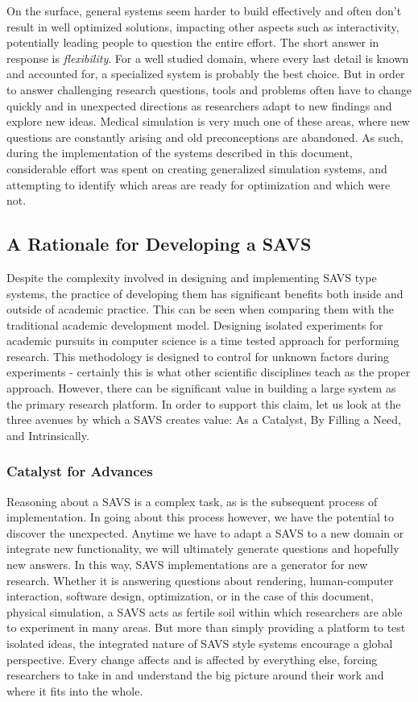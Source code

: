 On the surface, general systems seem harder to build effectively and
often don't result in well optimized solutions, impacting other
aspects such as interactivity, potentially leading people to question
the entire effort. The short answer in response is \textit{flexibility}. For a
well studied domain, where every last detail is known and accounted
for, a specialized system is probably the best choice. But in order to
answer challenging research questions, tools and problems often have
to change quickly and in unexpected directions as researchers adapt to new
findings and explore new ideas. Medical simulation is very much
one of these areas, where new questions are constantly arising and old
preconceptions are abandoned. As such, during the implementation of
the systems described in this document, considerable effort was spent
on creating generalized simulation systems, and attempting to identify
which areas are ready for optimization and which were not.

 
\subsection{A Rationale for Developing a SAVS}

Despite the complexity involved in designing and implementing SAVS
type systems, the practice of developing them has significant benefits
both inside and outside of academic practice. This can be seen when
comparing them with the traditional academic development model.
Designing isolated experiments for academic pursuits in computer
science is a time tested approach for performing research. This
methodology is designed to control for unknown factors during
experiments - certainly this is what other scientific disciplines
teach as the proper approach. However, there can be significant value
in building a large system as the primary research platform. In order to
support this claim, let us look at the three avenues by which a
SAVS creates value: As a Catalyst, By Filling a Need, and
Intrinsically.

\subsubsection{Catalyst for Advances}

Reasoning about a SAVS is a complex task, as is the subsequent process
of implementation. In going about this process however, we have the
potential to discover the unexpected. Anytime we have to adapt a SAVS
to a new domain or integrate new functionality, we will ultimately
generate questions and hopefully new answers. In this way, SAVS
implementations are a generator for new research. Whether it is
answering questions about rendering, human-computer interaction,
software design, optimization, or in the case of this document,
physical simulation, a SAVS acts as fertile soil within which
researchers are able to experiment in many areas. But more than simply
providing a platform to test isolated ideas, the integrated nature of
SAVS style systems encourage a global perspective. Every change affects
and is affected by everything else, forcing researchers to take in and
understand the big picture around their work and where it fits into
the whole.

